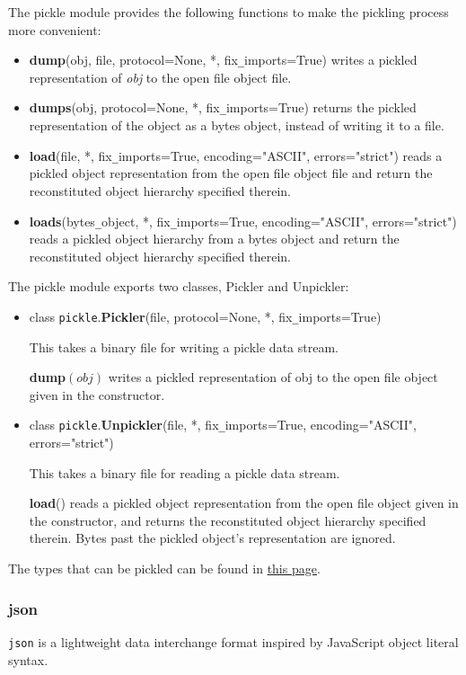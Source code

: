 The pickle module provides the following functions to make the pickling process more convenient:
\begin{itemize}
\item \textbf{dump}(obj, file, protocol=None, *, fix\verb?_?imports=True) writes a pickled representation of \textit{obj} to the open file object file.
\item \textbf{dumps}(obj, protocol=None, *, fix\verb?_?imports=True) returns the pickled representation of the object as a bytes object, instead of writing it to a file.
\item \textbf{load}(file, *, fix\verb?_?imports=True, encoding="ASCII", errors="strict") reads a pickled object representation from the open file object file and return the reconstituted object hierarchy specified therein.
\item \textbf{loads}(bytes\verb?_?object, *, fix\verb?_?imports=True, encoding="ASCII", errors="strict") reads a pickled object hierarchy from a bytes object and return the reconstituted object hierarchy specified therein.
\end{itemize} 
The pickle module exports two classes, Pickler and Unpickler:
\begin{itemize}
\item class \texttt{pickle}.\textbf{Pickler}(file, protocol=None, *, fix\verb?_?imports=True)

This takes a binary file for writing a pickle data stream.

\textbf{dump}$(obj)$ writes a pickled representation of obj to the open file object given in the constructor.

\item class \texttt{pickle}.\textbf{Unpickler}(file, *, fix\verb?_?imports=True, encoding="ASCII", errors="strict")

This takes a binary file for reading a pickle data stream.

\textbf{load}() reads a pickled object representation from the open file object given in the constructor, and returns the reconstituted object hierarchy specified therein. Bytes past the pickled object’s representation are ignored.
\end{itemize}
The types that can be pickled can be found in \href{https://docs.python.org/3.6/library/pickle.html#what-can-be-pickled-and-unpickled}{this page}.

\subsubsection{json}
\texttt{json}  is a lightweight data interchange format inspired by JavaScript object literal syntax.

